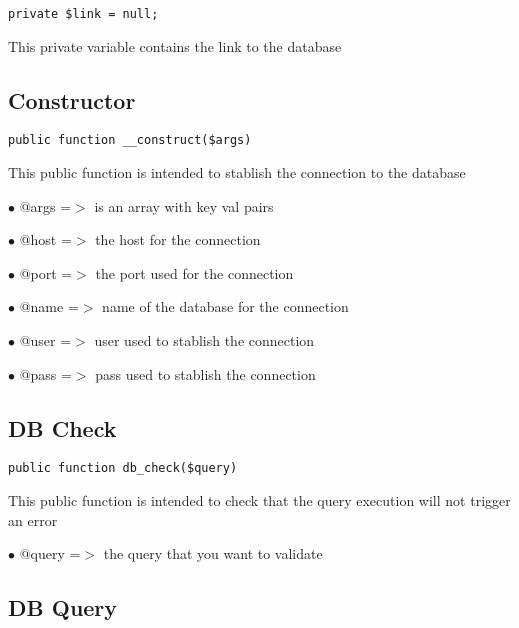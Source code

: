 \documentclass[a4paper]{book}
\begin{document}
\begin{lstlisting}
private $link = null;
\end{lstlisting}

This private variable contains the link to the database

\hypertarget{toc319}{}
\subsection{Constructor}

\begin{lstlisting}
public function __construct($args)
\end{lstlisting}

This public function is intended to stablish the connection to the database

\begin{compactitem}
\item[\color{myblue}$\bullet$] @args =$>$ is an array with key val pairs
\item[\color{myblue}$\bullet$] @host =$>$ the host for the connection
\item[\color{myblue}$\bullet$] @port =$>$ the port used for the connection
\item[\color{myblue}$\bullet$] @name =$>$ name of the database for the connection
\item[\color{myblue}$\bullet$] @user =$>$ user used to stablish the connection
\item[\color{myblue}$\bullet$] @pass =$>$ pass used to stablish the connection
\end{compactitem}

\hypertarget{toc320}{}
\subsection{DB Check}

\begin{lstlisting}
public function db_check($query)
\end{lstlisting}

This public function is intended to check that the query execution will not trigger an error

\begin{compactitem}
\item[\color{myblue}$\bullet$] @query =$>$ the query that you want to validate
\end{compactitem}

\hypertarget{toc321}{}
\subsection{DB Query}
\end{document}
